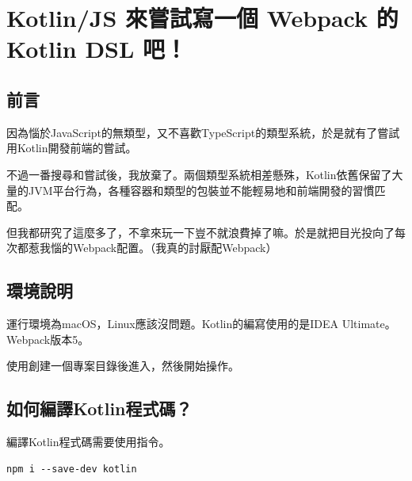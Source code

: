 \chapter{Kotlin/JS 來嘗試寫一個 Webpack 的 Kotlin DSL 吧！}










\section*{前言}

因為惱於JavaScript的無類型，又不喜歡TypeScript的類型系統，於是就有了嘗試用Kotlin開發前端的嘗試。

不過一番搜尋和嘗試後，我放棄了。兩個類型系統相差懸殊，Kotlin依舊保留了大量的JVM平台行為，各種容器和類型的包裝並不能輕易地和前端開發的習慣匹配。

但我都研究了這麼多了，不拿來玩一下豈不就浪費掉了嘛。於是就把目光投向了每次都惹我惱的Webpack配置。（我真的討厭配Webpack）







\section*{環境說明}



運行環境為macOS，Linux應該沒問題。Kotlin的編寫使用的是IDEA Ultimate。Webpack版本5。

使用創建一個專案目錄後進入，然後開始操作。







\section*{如何編譯Kotlin程式碼？}

編譯Kotlin程式碼需要使用指令。

\begin{lstlisting}
npm i --save-dev kotlin
\end{lstlisting}

